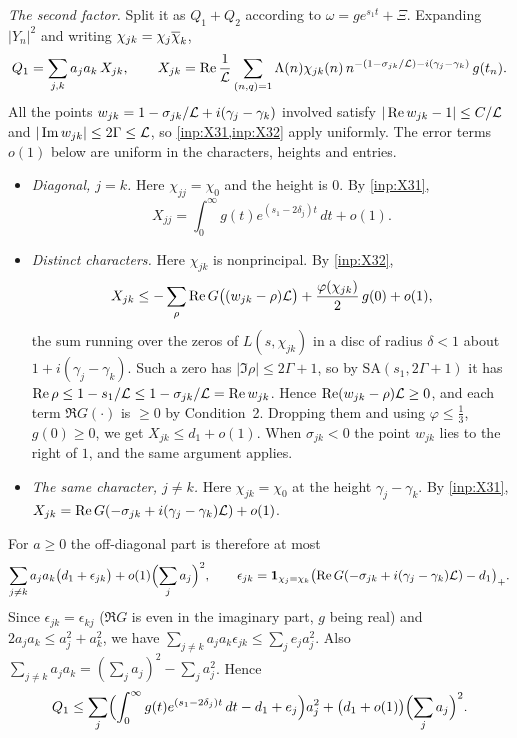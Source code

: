 \emph{The second factor.} Split it as $Q_1+Q_2$ according to $\omega=ge^{s_1t}+\Xi$. Expanding
$|Y_n|^2$ and writing $\chi_{jk}=\chi_j\overline{\chi}_k$,
\[
  Q_1=\sum_{j,k}a_ja_k\,X_{jk},\qquad
  X_{jk}=\operatorname{Re}\frac1{\mathcal{L}}\sum_{(n,q)=1}\Lambda(n)\chi_{jk}(n)\,n^{-(1-\sigma_{jk}/\mathcal{L})-i(\gamma_j-\gamma_k)}\,
  g(t_n).
\]
All the points $w_{jk}=1-\sigma_{jk}/\mathcal{L}+i(\gamma_j-\gamma_k)$ involved satisfy $|\operatorname{Re} w_{jk}-1|\le C/\mathcal{L}$ and
$|\operatorname{Im} w_{jk}|\le2\Gamma\le\mathcal{L}$, so \cref{inp:X31,inp:X32} apply uniformly. The error terms
$o(1)$ below are uniform in the characters, heights and entries.
\begin{itemize}
  \item \emph{Diagonal, $j=k$.} Here $\chi_{jj}=\chi_0$ and the height is $0$. By \cref{inp:X31},
    \[
      X_{jj}=\int_0^\infty g(t)e^{(s_1-2\delta_j)t}\,dt+o(1).
    \]
  \item \emph{Distinct characters.} Here $\chi_{jk}$ is nonprincipal. By \cref{inp:X32},
    \[
      X_{jk}\le-\sum_{\rho}\operatorname{Re} G\bigl((w_{jk}-\rho)\mathcal{L}\bigr)+\frac{\varphi(\chi_{jk})}2\,g(0)+o(1),
    \]
    the sum running over the zeros of $L(s,\chi_{jk})$ in a disc of radius $\delta<1$ about
    $1+i(\gamma_j-\gamma_k)$. Such a zero has $|\Im\rho|\le2\Gamma+1$, so by $\mathrm{SA}(s_1,2\Gamma+1)$ it
    has $\operatorname{Re}\rho\le1-s_1/\mathcal{L}\le1-\sigma_{jk}/\mathcal{L}=\operatorname{Re} w_{jk}$. Hence $\operatorname{Re}(w_{jk}-\rho)\mathcal{L}\ge0$, and each term
    $\Re G(\cdot)$ is $\ge0$ by Condition~2. Dropping them and using $\varphi\le\frac13$, $g(0)\ge0$,
    we get $X_{jk}\le d_1+o(1)$. When $\sigma_{jk}<0$ the point $w_{jk}$ lies to the right of $1$, and
    the same argument applies.
  \item \emph{The same character, $j\ne k$.} Here $\chi_{jk}=\chi_0$ at the height
    $\gamma_j-\gamma_k$. By \cref{inp:X31},
    $X_{jk}=\operatorname{Re} G(-\sigma_{jk}+i(\gamma_j-\gamma_k)\mathcal{L})+o(1)$.
\end{itemize}
For $a\ge0$ the off-diagonal part is therefore at most
\[
  \sum_{j\ne k}a_ja_k\bigl(d_1+\epsilon_{jk}\bigr)+o(1)\Bigl(\sum_ja_j\Bigr)^2,\qquad
  \epsilon_{jk}=\mathbf{1}_{\chi_j=\chi_k}\bigl(\operatorname{Re} G(-\sigma_{jk}+i(\gamma_j-\gamma_k)\mathcal{L})-d_1\bigr)_+ .
\]
Since $\epsilon_{jk}=\epsilon_{kj}$ ($\Re G$ is even in the imaginary part, $g$ being real) and
$2a_ja_k\le a_j^2+a_k^2$, we have $\sum_{j\ne k}a_ja_k\epsilon_{jk}\le\sum_je_ja_j^2$. Also
$\sum_{j\ne k}a_ja_k=(\sum_ja_j)^2-\sum_ja_j^2$. Hence
\begin{equation}\label{eq:Q1}
  Q_1\le\sum_j\Bigl(\int_0^\infty g(t)e^{(s_1-2\delta_j)t}\,dt-d_1+e_j\Bigr)a_j^2
  +\bigl(d_1+o(1)\bigr)\Bigl(\sum_ja_j\Bigr)^2 .
\end{equation}

